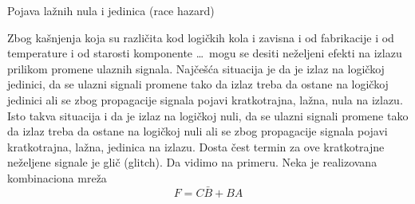 \begin{frame}[label=02-s050]{Pojava lažnih nula i jedinica}
\gusttekst
\centering (race hazard)\par
\raggedright
Zbog kašnjenja koja su različita kod logičkih kola i zavisna i od fabrikacije i od temperature i od starosti komponente \ldots\ mogu se desiti neželjeni efekti na izlazu prilikom promene ulaznih signala. Najčešća situacija je da je izlaz na logičkoj jedinici, da se ulazni signali promene tako da izlaz treba da ostane na logičkoj jedinici ali se zbog propagacije signala pojavi kratkotrajna, lažna, nula na izlazu. Isto takva situacija i da je izlaz na logičkoj nuli, da se ulazni signali promene tako da izlaz treba da ostane na logičkoj nuli ali se zbog propagacije signala pojavi kratkotrajna, lažna, jedinica na izlazu. Dosta čest termin za ove kratkotrajne neželjene signale je glič (glitch). Da vidimo na primeru. Neka je realizovana kombinaciona mreža
\[
F=C\bar B+BA
\]
\centering

\end{frame}
